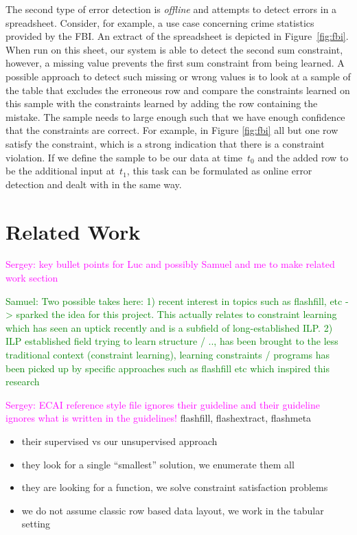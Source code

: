 \documentclass{sig-alternate-05-2015}
\newcommand{\sergey}[1]{\textcolor{magenta}{{\sc Sergey:} #1}\xspace}
\newcommand{\samuel}[1]{\textcolor{green}{{\sc Samuel:} #1}\xspace}
\begin{document}
The second type of error detection is \textit{offline} and attempts to detect errors in a spreadsheet.
Consider, for example, a use case concerning crime statistics provided by the FBI.
An extract of the spreadsheet is depicted in Figure~\ref{fig:fbi}.
When run on this sheet, our system is able to detect the second sum constraint, however, a missing value prevents the first sum constraint from being learned.
A possible approach to detect such missing or wrong values is to look at a sample of the table that excludes the erroneous row and compare the constraints learned on this sample with the constraints learned by adding the row containing the mistake.
The sample needs to large enough such that we have enough confidence that the constraints are correct. For example, in Figure \ref{fig:fbi} all but one row satisfy the constraint, which is a strong indication that there is a constraint violation.
If we define the sample to be our data at time~$t_0$ and the added row to be the additional input at~$t_1$, this task can be formulated as online error detection and dealt with in the same way.

\section{Related Work}\label{sec:related_work}
\sergey{key bullet points for Luc and possibly Samuel and me to make related work section}

\samuel{Two possible takes here: 1) recent interest in topics such as flashfill, etc -> sparked the idea for this project. This actually relates to constraint learning which has seen an uptick recently and is a subfield of long-established ILP. 2) ILP established field trying to learn structure / .., has been brought to the less traditional context (constraint learning), learning constraints / programs has been picked up by specific approaches such as flashfill etc which inspired this research}

\sergey{ECAI reference style file ignores their guideline and their guideline ignores what is written in the guidelines!}
flashfill, flashextract, flashmeta \cite{flashfill,flashextract,flashmeta}
\begin{itemize}
  \item their supervised vs our unsupervised approach
  \item they look for a single ``smallest'' solution, we enumerate them all
  \item they are looking for a function, we solve constraint satisfaction problems
  \item we do not assume classic row based data layout, we work in the tabular setting
\end{itemize}
\end{document}
